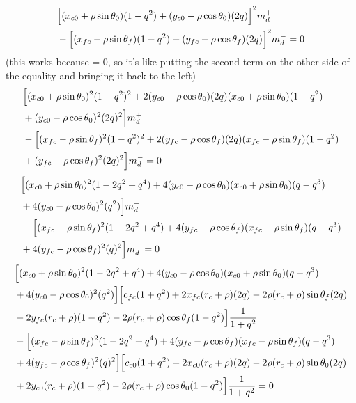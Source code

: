 \documentclass[12pt]{article}
\begin{document}
\begin{align*}
    &\Bigl[(x_{c0} + \rho\sin\theta_0)(1-q^2) + (y_{c0} - \rho\cos\theta_0)(2q) \Bigr]^2 m_d^+\\
    &- \Bigl[ (x_{fc} - \rho\sin\theta_f)(1-q^2) + (y_{fc} - \rho\cos\theta_f)(2q) \Bigr]^2 m_d^- = 0
\end{align*}
(this works because = 0, so it's like putting the second term on the other side of the equality and bringing it back to the left)
\begin{align*}
    &\Bigl[(x_{c0} + \rho\sin\theta_0)^2(1-q^2)^2 + 2(y_{c0} - \rho\cos\theta_0)(2q)(x_{c0} + \rho\sin\theta_0)(1-q^2)\\&+ (y_{c0} - \rho\cos\theta_0)^2(2q)^2 \Bigr] m_d^+\\
    &- \Bigl[ (x_{fc} - \rho\sin\theta_f)^2(1-q^2)^2 + 2(y_{fc} - \rho\cos\theta_f)(2q)(x_{fc} - \rho\sin\theta_f)(1-q^2)\\&+ (y_{fc} - \rho\cos\theta_f)^2(2q)^2 \Bigr] m_d^- = 0
\end{align*}
\begin{align*}
    &\Bigl[(x_{c0} + \rho\sin\theta_0)^2(1-2q^2 + q^4) + 4(y_{c0} - \rho\cos\theta_0)(x_{c0} + \rho\sin\theta_0)(q-q^3)\\&+ 4(y_{c0} - \rho\cos\theta_0)^2(q^2) \Bigr] m_d^+\\
    &- \Bigl[ (x_{fc} - \rho\sin\theta_f)^2(1-2q^2 + q^4) + 4(y_{fc} - \rho\cos\theta_f)(x_{fc} - \rho\sin\theta_f)(q-q^3)\\&+ 4(y_{fc} - \rho\cos\theta_f)^2(q)^2 \Bigr] m_d^- = 0
\end{align*}
\begin{align*}
    &\Bigl[(x_{c0} + \rho\sin\theta_0)^2(1-2q^2 + q^4) + 4(y_{c0} - \rho\cos\theta_0)(x_{c0} + \rho\sin\theta_0)(q-q^3)\\&+ 4(y_{c0} - \rho\cos\theta_0)^2(q^2) \Bigr] \Bigl[c_{fc}(1 + q^2) + 2x_{fc}(r_c+\rho)(2q) - 2\rho(r_c+\rho)\sin\theta_f(2q)\\
    &- 2y_{fc}(r_c+\rho)(1 - q^2) - 2\rho(r_c+\rho)\cos\theta_f(1 - q^2) \Bigr] \frac{1}{1+q^2}\\
    &- \Bigl[ (x_{fc} - \rho\sin\theta_f)^2(1-2q^2 + q^4) + 4(y_{fc} - \rho\cos\theta_f)(x_{fc} - \rho\sin\theta_f)(q-q^3)\\&+ 4(y_{fc} - \rho\cos\theta_f)^2(q)^2 \Bigr] \Bigl[ c_{c0}(1 + q^2) - 2x_{c0}(r_c+\rho)(2q) - 2\rho(r_c+\rho)\sin\theta_0(2q)\\
    &+ 2y_{c0}(r_c+\rho)(1-q^2) - 2\rho(r_c+\rho)\cos\theta_0(1 - q^2) \Bigr] \frac{1}{1+q^2} = 0
\end{align*}
\end{document}
